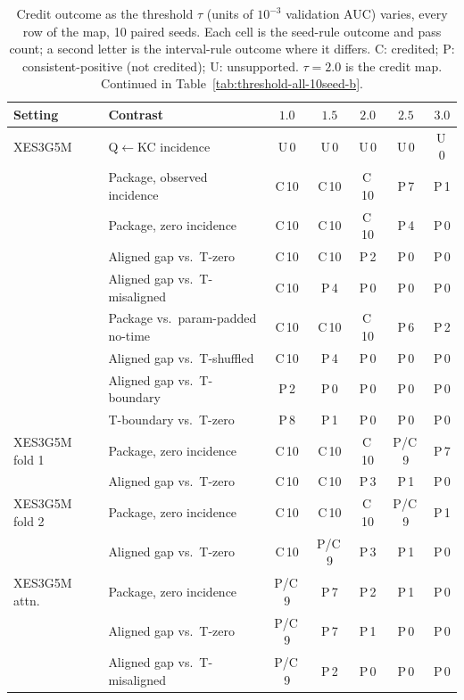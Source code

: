 \begin{table}[tbp]
\caption{Credit outcome as the threshold $\tau$ (units of $10^{-3}$
validation AUC) varies, every row of the map, 10 paired seeds. Each
cell is the seed-rule outcome and pass count; a second letter is the
interval-rule outcome where it differs. C: credited; P:
consistent-positive (not credited); U: unsupported. $\tau=2.0$ is the
credit map. Continued in Table~\ref{tab:threshold-all-10seed-b}.}
\label{tab:threshold-all-10seed}
\centering
\scriptsize
\setlength{\tabcolsep}{1.5pt}
\renewcommand{\arraystretch}{0.84}
\begin{tabular}{@{}llccccc@{}}
\toprule
Setting & Contrast & $1.0$ & $1.5$ & $2.0$ & $2.5$ & $3.0$ \\
\midrule
XES3G5M & Q$\leftarrow$KC incidence & U\,0 & U\,0 & U\,0 & U\,0 & U\,0 \\
 & Package, observed incidence & C\,10 & C\,10 & C\,10 & P\,7 & P\,1 \\
 & Package, zero incidence & C\,10 & C\,10 & C\,10 & P\,4 & P\,0 \\
 & Aligned gap vs.\ T-zero & C\,10 & C\,10 & P\,2 & P\,0 & P\,0 \\
 & Aligned gap vs.\ T-misaligned & C\,10 & P\,4 & P\,0 & P\,0 & P\,0 \\
 & Package vs.\ param-padded no-time & C\,10 & C\,10 & C\,10 & P\,6 & P\,2 \\
 & Aligned gap vs.\ T-shuffled & C\,10 & P\,4 & P\,0 & P\,0 & P\,0 \\
 & Aligned gap vs.\ T-boundary & P\,2 & P\,0 & P\,0 & P\,0 & P\,0 \\
 & T-boundary vs.\ T-zero & P\,8 & P\,1 & P\,0 & P\,0 & P\,0 \\
\addlinespace
XES3G5M fold 1 & Package, zero incidence & C\,10 & C\,10 & C\,10 & P/C\,9 & P\,7 \\
 & Aligned gap vs.\ T-zero & C\,10 & C\,10 & P\,3 & P\,1 & P\,0 \\
\addlinespace
XES3G5M fold 2 & Package, zero incidence & C\,10 & C\,10 & C\,10 & P/C\,9 & P\,1 \\
 & Aligned gap vs.\ T-zero & C\,10 & P/C\,9 & P\,3 & P\,1 & P\,0 \\
\addlinespace
XES3G5M attn. & Package, zero incidence & P/C\,9 & P\,7 & P\,2 & P\,1 & P\,0 \\
 & Aligned gap vs.\ T-zero & P/C\,9 & P\,7 & P\,1 & P\,0 & P\,0 \\
 & Aligned gap vs.\ T-misaligned & P/C\,9 & P\,2 & P\,0 & P\,0 & P\,0 \\

\end{tabular}
\end{table}
